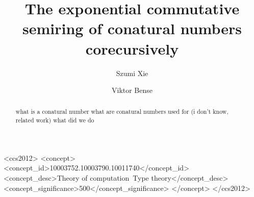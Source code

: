 \documentclass[sigplan, screen, natbib=false, review]{acmart}
\begin{document}
\title{The exponential commutative semiring of conatural numbers corecursively}

\author{Szumi Xie}

\author{Viktor Bense}


\begin{abstract}
  what is a conatural number
  what are conatural numbers used for (i don't know, related work)
  what did we do
\end{abstract}

\begin{CCSXML}
  <ccs2012>
  <concept>
  <concept_id>10003752.10003790.10011740</concept_id>
  <concept_desc>Theory of computation~Type theory</concept_desc>
  <concept_significance>500</concept_significance>
  </concept>
  </ccs2012>
\end{CCSXML}


\end{document}
